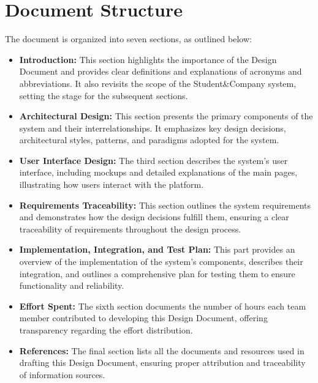 \section{Document Structure}

The document is organized into seven sections, as outlined below:

\begin{itemize}
    \item \textbf{Introduction:}  
    This section highlights the importance of the Design Document and provides clear definitions and explanations of acronyms and abbreviations. It also revisits the scope of the Student\&Company system, setting the stage for the subsequent sections.

    \item \textbf{Architectural Design:}  
    This section presents the primary components of the system and their interrelationships. It emphasizes key design decisions, architectural styles, patterns, and paradigms adopted for the system.

    \item \textbf{User Interface Design:}  
    The third section describes the system's user interface, including mockups and detailed explanations of the main pages, illustrating how users interact with the platform.

    \item \textbf{Requirements Traceability:}  
    This section outlines the system requirements and demonstrates how the design decisions fulfill them, ensuring a clear traceability of requirements throughout the design process.

    \item \textbf{Implementation, Integration, and Test Plan:}  
    This part provides an overview of the implementation of the system's components, describes their integration, and outlines a comprehensive plan for testing them to ensure functionality and reliability.

    \item \textbf{Effort Spent:}  
    The sixth section documents the number of hours each team member contributed to developing this Design Document, offering transparency regarding the effort distribution.

    \item \textbf{References:}  
    The final section lists all the documents and resources used in drafting this Design Document, ensuring proper attribution and traceability of information sources.
\end{itemize}